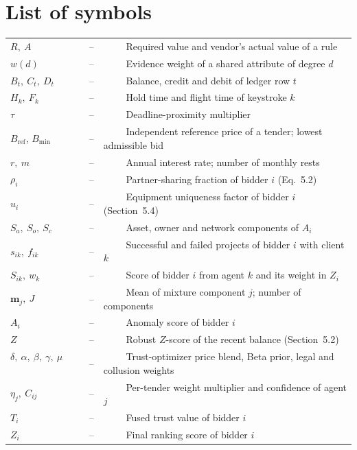 \documentclass[a4paper, 12pt]{report}
\theoremstyle{definition}
\begin{document}
\section*{{\huge List of symbols}\hfill} 
\vspace{1.2cm}
\begin{tabular}{lll}
$R,\ A$ ~~~~&--&~~~~ Required value and vendor's actual value of a rule\\
$w(d)$ ~~~~&--&~~~~ Evidence weight of a shared attribute of degree $d$\\
$B_t,\ C_t,\ D_t$ ~~~~&--&~~~~ Balance, credit and debit of ledger row $t$\\
$H_k,\ F_k$ ~~~~&--&~~~~ Hold time and flight time of keystroke $k$\\
$\tau$ ~~~~&--&~~~~ Deadline-proximity multiplier\\
$B_{\mathrm{ref}}$, $B_{\min}$ ~~~~&--&~~~~ Independent reference price of a tender; lowest admissible bid\\
$r,\ m$ ~~~~&--&~~~~ Annual interest rate; number of monthly rests\\
$\rho_i$ ~~~~&--&~~~~ Partner-sharing fraction of bidder $i$ (Eq.~5.2)\\
$u_i$ ~~~~&--&~~~~ Equipment uniqueness factor of bidder $i$ (Section~5.4)\\
$S_a,\ S_o,\ S_c$ ~~~~&--&~~~~ Asset, owner and network components of $A_i$\\
$s_{ik},\ f_{ik}$ ~~~~&--&~~~~ Successful and failed projects of bidder $i$ with client $k$\\
$S_{ik},\ w_k$ ~~~~&--&~~~~ Score of bidder $i$ from agent $k$ and its weight in $Z_i$\\
$\mathbf{m}_j,\ J$ ~~~~&--&~~~~ Mean of mixture component $j$; number of components\\
$A_i$ ~~~~&--&~~~~ Anomaly score of bidder $i$\\
$Z$ ~~~~&--&~~~~ Robust $Z$-score of the recent balance (Section~5.2)\\
$\delta,\ \alpha,\ \beta,\ \gamma,\ \mu$ ~~~~&--&~~~~ Trust-optimizer price blend, Beta prior, legal and collusion weights\\
$\eta_j,\ C_{ij}$ ~~~~&--&~~~~ Per-tender weight multiplier and confidence of agent $j$\\
$T_i$ ~~~~&--&~~~~ Fused trust value of bidder $i$\\
$Z_i$ ~~~~&--&~~~~ Final ranking score of bidder $i$\\
\end{tabular}
\end{document}

